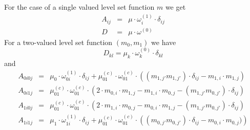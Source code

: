 For the case of a single valued level set function $m$ we get 
\begin{equation}\label{ref:EQU:REG:601}
\begin{array}{rcl}
 A_{ij} & =&  \mu \cdot \omega^{(1)}_i \cdot \delta_{ij}  \\
D & = &  \mu \cdot \omega^{(0)} 
\end{array}
\end{equation}
For a two-valued level set function $(m_0,m_1)$ we have
\begin{equation}\label{ref:EQU:REG:602}
D_{kl}  =   \mu_k \cdot \omega^{(0)}_k \cdot \delta_{kl} 
\end{equation} 
and 
\begin{equation}\label{ref:EQU:REG:603}
\begin{array}{rcl}
A_{0i0j} & = & \mu_0 \cdot \omega^{(1)}_{0i} \cdot \delta_{ij} + \mu^{(c)}_{01} \cdot \omega^{(c)}_{01} \cdot 
\left( (m_{1,j'}m_{1,j'} )\cdot \delta_{ij}  -  m_{1,i} \cdot m_{1,j} \right)    \\
A_{0i1j} & = & \mu^{(c)}_{01} \cdot \omega^{(c)}_{01} \cdot \left( 2 \cdot m_{0,i} \cdot  m_{1,j}
- m_{1,i} \cdot  m_{0,j} - ( m_{1,j'} m_{0,j'} ) \cdot  \delta_{ij}
\right)  \\
A_{1i0j} & = & \mu^{(c)}_{01} \cdot \omega^{(c)}_{01} \cdot \left( 2 \cdot m_{1,i} \cdot  m_{0,j}
- m_{0,i} \cdot  m_{1,j} - ( m_{1,j'} m_{0,j'} ) \cdot  \delta_{ij} \right)  \\
A_{1i1j} & = &  \mu_1 \cdot \omega^{(1)}_{1i} \cdot \delta_{ij} + \mu^{(c)}_{01} \cdot \omega^{(c)}_{01} \cdot
\left( (m_{0,j'}m_{0,j'} ) \cdot \delta_{ij}  -  m_{0,i} \cdot m_{0,j}  ) \right) 
\end{array}
\end{equation} 


